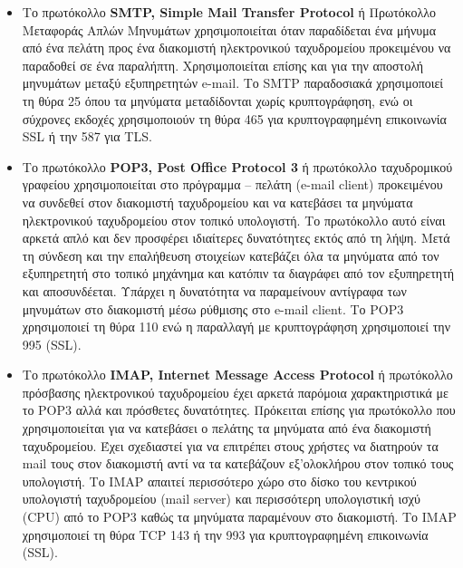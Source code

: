 \begin{itemize}
\item Το πρωτόκολλο \textbf{SMTP, Simple Mail Transfer Protocol} ή Πρωτόκολλο Μεταφοράς Απλών Μηνυμάτων χρησιμοποιείται όταν παραδίδεται ένα μήνυμα από ένα πελάτη προς ένα διακομιστή ηλεκτρονικού ταχυδρομείου προκειμένου να παραδοθεί σε ένα παραλήπτη. Χρησιμοποιείται επίσης και για την αποστολή μηνυμάτων μεταξύ εξυπηρετητών e-mail. Το SMTP παραδοσιακά χρησιμοποιεί τη θύρα 25 όπου τα μηνύματα μεταδίδονται χωρίς κρυπτογράφηση, ενώ οι σύχρονες εκδοχές χρησιμοποιούν τη θύρα 465 για κρυπτογραφημένη επικοινωνία SSL ή την 587 για TLS.
\item Το πρωτόκολλο \textbf{POP3, Post Office Protocol 3} ή πρωτόκολλο ταχυδρομικού γραφείου χρησιμοποιείται στο πρόγραμμα -- πελάτη (e-mail client) προκειμένου να συνδεθεί στον διακομιστή ταχυδρομείου και να κατεβάσει τα μηνύματα ηλεκτρονικού ταχυδρομείου στον τοπικό υπολογιστή. Το πρωτόκολλο αυτό είναι αρκετά απλό και δεν προσφέρει ιδιαίτερες δυνατότητες εκτός από τη λήψη. Μετά τη σύνδεση και την επαλήθευση στοιχείων κατεβάζει όλα τα μηνύματα από τον εξυπηρετητή στο τοπικό μηχάνημα και κατόπιν τα διαγράφει από τον εξυπηρετητή και αποσυνδέεται. Υπάρχει η δυνατότητα να παραμείνουν αντίγραφα των μηνυμάτων στο διακομιστή μέσω ρύθμισης στο e-mail client. Το POP3 χρησιμοποιεί τη θύρα 110 ενώ η παραλλαγή με κρυπτογράφηση χρησιμοποιεί την 995 (SSL).
\item Το πρωτόκολλο \textbf{IMAP, Internet Message Access Protocol} ή πρωτόκολλο πρόσβασης ηλεκτρονικού ταχυδρομείου έχει αρκετά παρόμοια χαρακτηριστικά με το POP3 αλλά και πρόσθετες δυνατότητες. Πρόκειται επίσης για πρωτόκολλο που χρησιμοποιείται για να κατεβάσει ο πελάτης τα μηνύματα από ένα διακομιστή ταχυδρομείου. Έχει σχεδιαστεί για να επιτρέπει στους χρήστες να διατηρούν τα mail τους στον διακομιστή αντί να τα κατεβάζουν εξ'ολοκλήρου στον τοπικό τους υπολογιστή. Το IMAP απαιτεί περισσότερο χώρο στο δίσκο του κεντρικού υπολογιστή ταχυδρομείου (mail server) και περισσότερη υπολογιστική ισχύ (CPU) από το POP3 καθώς τα μηνύματα παραμένουν στο διακομιστή. Το IMAP χρησιμοποιεί τη θύρα TCP 143 ή την 993 για κρυπτογραφημένη επικοινωνία (SSL).
\end{itemize}

